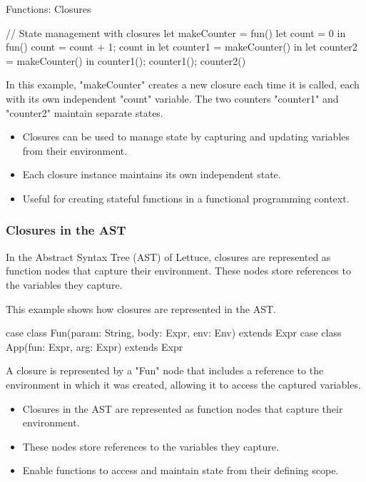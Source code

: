 \begin{notes}{Functions: Closures}
\begin{highlight}
    \begin{code}[Lettuce]
    // State management with closures
    let makeCounter = fun() {
        let count = 0 in
        fun() {
            count = count + 1;
            count
        }
    } in
    let counter1 = makeCounter() in
    let counter2 = makeCounter() in
    counter1(); counter1(); counter2()
    \end{code}
    
        In this example, "makeCounter" creates a new closure each time it is called, each with its own independent "count" variable. The two counters "counter1" and "counter2" maintain separate states.
    
        \begin{itemize}
            \item Closures can be used to manage state by capturing and updating variables from their environment.
            \item Each closure instance maintains its own independent state.
            \item Useful for creating stateful functions in a functional programming context.
        \end{itemize}
    
    \end{highlight}
    
    \subsubsection*{Closures in the AST}
    
    In the Abstract Syntax Tree (AST) of Lettuce, closures are represented as function nodes that capture their environment. These nodes store references to the variables they capture.
    
    \begin{highlight}
    
        This example shows how closures are represented in the AST.
    
    \begin{code}[Scala]
    case class Fun(param: String, body: Expr, env: Env) extends Expr
    case class App(fun: Expr, arg: Expr) extends Expr
    \end{code}
    
        A closure is represented by a "Fun" node that includes a reference to the environment in which it was created, allowing it to access the captured variables.
    
        \begin{itemize}
            \item Closures in the AST are represented as function nodes that capture their environment.
            \item These nodes store references to the variables they capture.
            \item Enable functions to access and maintain state from their defining scope.
        \end{itemize}
    

\end{highlight}
\end{notes}
